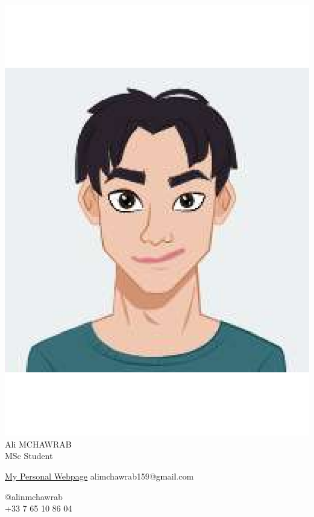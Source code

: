 \documentclass[8pt]{extarticle}
\begin{document}
\fontsize{6}{7}\selectfont
\centering
\includegraphics[width=0.18\linewidth]{logo}\\[-1pt]

Ali MCHAWRAB\\[-1pt]
MSc Student\\[3pt]

\begin{multicols}{2}
\raggedright
\href{https://ali-mchawrab159.github.io/}{My Personal Webpage}
alimchawrab159@gmail.com


\columnbreak
\raggedleft
@alinmchawrab\\
+33 7 65 10 86 04\\

\end{multicols}
\end{document}
